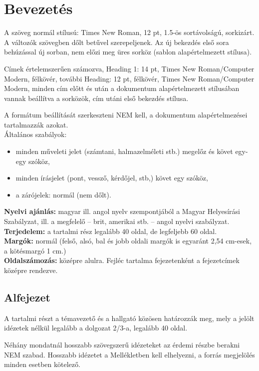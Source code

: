 \chapter{Bevezetés}

\thispagestyle{fancy}
\pagestyle{fancy}

A szöveg normál stílusú: Times New Roman, 12 pt, 1.5-ös sortávolságú, sorkizárt. A változók szövegben dőlt betűvel szerepeljenek. Az új bekezdés első sora behúzással új sorban, nem előzi meg üres sorköz (sablon alapértelmezett stílusa).\par
Címek értelemszerűen számozva, Heading 1: 14 pt, Times New Roman/Computer Modern, félkövér, további Heading: 12 pt, félkövér, Times New Roman/Computer Modern, minden cím előtt és után a dokumentum alapértelmezett stílusában vannak beállítva a sorközök, cím utáni első bekezdés stílusa.\par
A formátum beállítását szerkeszteni NEM kell, a dokumentum alapértelmezései tartalmazzák azokat.\\
Általános szabályok:
\begin{itemize}
    \item minden műveleti jelet (számtani, halmazelméleti stb.) megelőz és követ egy-egy szóköz,
    \item minden írásjelet (pont, vessző, kérdőjel, stb,) követ egy szóköz,
    \item a zárójelek: normál (nem dőlt).
\end{itemize}
\textbf{Nyelvi ajánlás:} magyar ill. angol nyelv szempontjából a Magyar Helyesírási Szabályzat, ill. a megfelelő – brit, amerikai stb. – angol nyelvi szabályzat.\\
\textbf{Terjedelem:} a tartalmi rész legalább 40 oldal, de legfeljebb 60 oldal.\\
\textbf{Margók:} normál (felső, alsó, bal és jobb oldali margók is egyaránt 2,54 cm-esek, a kötésmargó 1 cm.)\\
\textbf{Oldalszámozás:} középre alulra. Fejléc tartalma fejezetenként a fejezetcímek középre rendezve.\par

\section{Alfejezet}

A tartalmi részt a témavezető és a hallgató közösen határozzák meg, mely a jelölt idézetek nélkül legalább a dolgozat 2/3-a, legalább 40 oldal.\par
Néhány mondatnál hosszabb szövegszerű idézeteket az érdemi részbe berakni NEM szabad. Hosszabb idézetet a Mellékletben kell elhelyezni, a forrás megjelölés minden esetben kötelező.

